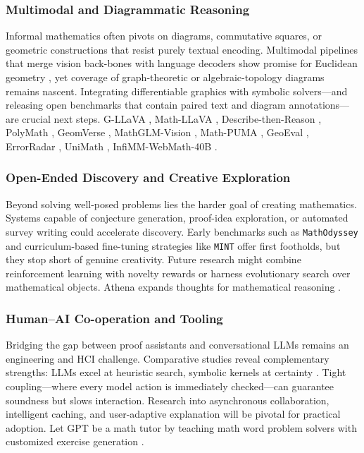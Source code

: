 \documentclass[acmsmall,anonymous]{acmart}
\begin{document}
\subsubsection{Multimodal and Diagrammatic Reasoning}\label{sec:diagramfuture}
Informal mathematics often pivots on diagrams, commutative squares, or geometric constructions that resist purely textual encoding.  Multimodal pipelines that merge vision back-bones with language decoders show promise for Euclidean geometry \cite{zhang2024diagramformalization,shi2024mathllava}, yet coverage of graph-theoretic or algebraic-topology diagrams remains nascent.  Integrating differentiable graphics with symbolic solvers—and releasing open benchmarks that contain paired text and diagram annotations—are crucial next steps. G-LLaVA \cite{gao2023}, Math-LLaVA \cite{shi2024}, Describe-then-Reason \cite{jia2024}, PolyMath \cite{gupta2024}, GeomVerse \cite{kazemi2023}, MathGLM-Vision \cite{yang2024b}, Math-PUMA \cite{zhuang2024}, GeoEval \cite{zhang2024d}, ErrorRadar \cite{yan2024a}, UniMath \cite{liang2023a}, InfiMM-WebMath-40B \cite{han2024}.

\subsubsection{Open-Ended Discovery and Creative Exploration}\label{sec:creativefuture}
Beyond solving well-posed problems lies the harder goal of creating mathematics.  Systems capable of conjecture generation, proof-idea exploration, or automated survey writing could accelerate discovery.  Early benchmarks such as \texttt{MathOdyssey} \cite{zhang2024mathodyssey} and curriculum-based fine-tuning strategies like \texttt{MINT} \cite{li2024mint} offer first footholds, but they stop short of genuine creativity.  Future research might combine reinforcement learning with novelty rewards or harness evolutionary search over mathematical objects. Athena expands thoughts for mathematical reasoning \cite{kim2023}.

\subsubsection{Human–AI Co-operation and Tooling}\label{sec:cooperationfuture}
Bridging the gap between proof assistants and conversational LLMs remains an engineering and HCI challenge.  Comparative studies reveal complementary strengths: LLMs excel at heuristic search, symbolic kernels at certainty \cite{johnson2024llmvsitp,yang-2023-leandojo}.  Tight coupling—where every model action is immediately checked—can guarantee soundness but slows interaction.  Research into asynchronous collaboration, intelligent caching, and user-adaptive explanation will be pivotal for practical adoption. Let GPT be a math tutor by teaching math word problem solvers with customized exercise generation \cite{liang2023let}.
\end{document}
